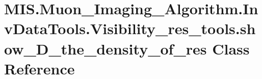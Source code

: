 \hypertarget{classMIS_1_1Muon__Imaging__Algorithm_1_1InvDataTools_1_1Visibility__res__tools_1_1show__2D__the__density__of__res}{}\section{M\+I\+S.\+Muon\+\_\+\+Imaging\+\_\+\+Algorithm.\+Inv\+Data\+Tools.\+Visibility\+\_\+res\+\_\+tools.\+show\+\_\+D\+\_\+the\+\_\+density\+\_\+of\+\_\+res Class Reference}
\label{classMIS_1_1Muon__Imaging__Algorithm_1_1InvDataTools_1_1Visibility__res__tools_1_1show__2D__the__density__of__res}
